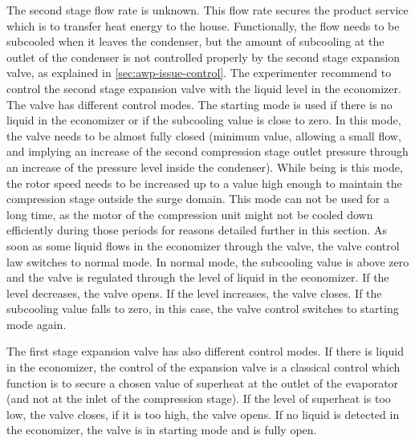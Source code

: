 The second stage flow rate is unknown. This flow rate secures the
product service which is to transfer heat energy to the
house. Functionally, the flow needs to be subcooled when it leaves the
condenser, but the amount of subcooling at the outlet of the condenser
is not controlled properly by the second stage expansion valve, as
explained in \cref{sec:awp-issue-control}. The experimenter recommend
to control the second stage expansion valve with the liquid level in
the economizer. The valve has different control modes. The starting
mode is used if there is no liquid in the economizer or if the
subcooling value is close to zero. In this mode, the valve needs to be
almost fully closed (minimum value, allowing a small flow, and
implying an increase of the second compression stage outlet pressure
through an increase of the pressure level inside the condenser). While
being is this mode, the rotor speed needs to be increased up to a
value high enough to maintain the compression stage outside the surge
domain. This mode can not be used for a long time, as the motor of the
compression unit might not be cooled down efficiently during those
periods for reasons detailed further in this section. As soon as some
liquid flows in the economizer through the valve, the valve control
law switches to normal mode. In normal mode, the subcooling value is
above zero and the valve is regulated through the level of liquid in
the economizer. If the level decreases, the valve opens. If the level
increases, the valve closes. If the subcooling value falls to zero, in
this case, the valve control switches to starting mode again.

The first stage expansion valve has also different control modes. If
there is liquid in the economizer, the control of the expansion valve
is a classical control which function is to secure a chosen value of
superheat at the outlet of the evaporator (and not at the inlet of the
compression stage). If the level of superheat is too low, the valve
closes, if it is too high, the valve opens. If no liquid is detected
in the economizer, the valve is in starting mode and is fully open.

